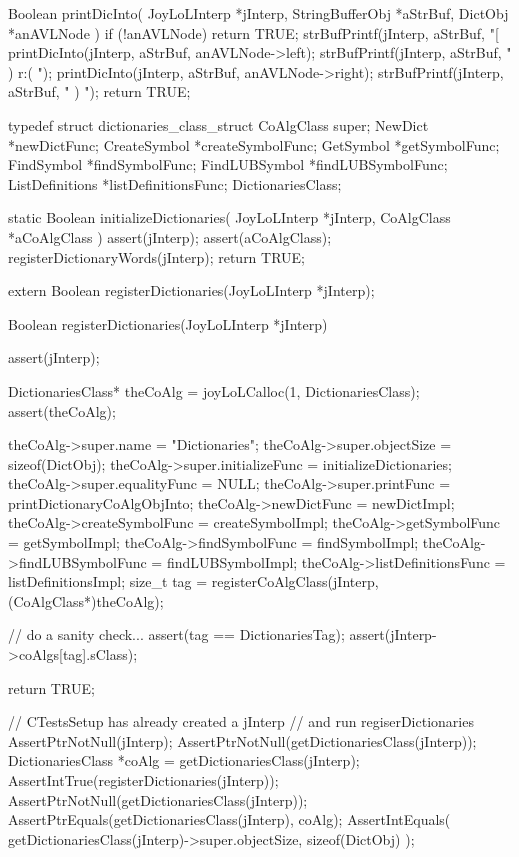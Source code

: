 Boolean printDicInto(
  JoyLoLInterp    *jInterp,
  StringBufferObj *aStrBuf,
  DictObj         *anAVLNode
) {
  if (!anAVLNode) return TRUE;
  strBufPrintf(jInterp, aStrBuf, "[%
  printDicInto(jInterp, aStrBuf, anAVLNode->left);
  strBufPrintf(jInterp, aStrBuf, " ) r:( ");
  printDicInto(jInterp, aStrBuf, anAVLNode->right);
  strBufPrintf(jInterp, aStrBuf, " ) ");
  return TRUE;
}
\stopCCode

\startTestSuite[registerDictionaries]

\startCHeader
typedef struct dictionaries_class_struct {
  CoAlgClass super;
  NewDict         *newDictFunc;
  CreateSymbol    *createSymbolFunc;
  GetSymbol       *getSymbolFunc;
  FindSymbol      *findSymbolFunc;
  FindLUBSymbol   *findLUBSymbolFunc;
  ListDefinitions *listDefinitionsFunc;
} DictionariesClass;
\stopCHeader

\startCCode
static Boolean initializeDictionaries(
  JoyLoLInterp *jInterp,
  CoAlgClass   *aCoAlgClass
) {
  assert(jInterp);
  assert(aCoAlgClass);
  registerDictionaryWords(jInterp);
  return TRUE;
}
\stopCCode

\startCHeader
extern Boolean registerDictionaries(JoyLoLInterp *jInterp);
\stopCHeader
{}

\startCCode
Boolean registerDictionaries(JoyLoLInterp *jInterp) {
  assert(jInterp);
  
  DictionariesClass* theCoAlg =
    joyLoLCalloc(1, DictionariesClass);
  assert(theCoAlg);
  
  theCoAlg->super.name            = "Dictionaries";
  theCoAlg->super.objectSize      = sizeof(DictObj);
  theCoAlg->super.initializeFunc  = initializeDictionaries;
  theCoAlg->super.equalityFunc    = NULL;
  theCoAlg->super.printFunc       = printDictionaryCoAlgObjInto;
  theCoAlg->newDictFunc           = newDictImpl;
  theCoAlg->createSymbolFunc      = createSymbolImpl;
  theCoAlg->getSymbolFunc         = getSymbolImpl;
  theCoAlg->findSymbolFunc        = findSymbolImpl;
  theCoAlg->findLUBSymbolFunc     = findLUBSymbolImpl;
  theCoAlg->listDefinitionsFunc   = listDefinitionsImpl;
  size_t tag =
    registerCoAlgClass(jInterp, (CoAlgClass*)theCoAlg);
  
  // do a sanity check...
  assert(tag == DictionariesTag);
  assert(jInterp->coAlgs[tag].sClass);
    
  return TRUE;
}
\stopCCode


\startCTest
  // CTestsSetup has already created a jInterp
  // and run regiserDictionaries
  AssertPtrNotNull(jInterp);
  AssertPtrNotNull(getDictionariesClass(jInterp));
  DictionariesClass *coAlg =
    getDictionariesClass(jInterp);
  AssertIntTrue(registerDictionaries(jInterp));
  AssertPtrNotNull(getDictionariesClass(jInterp));
  AssertPtrEquals(getDictionariesClass(jInterp), coAlg);
  AssertIntEquals(
    getDictionariesClass(jInterp)->super.objectSize, 
    sizeof(DictObj)
  );
\stopCTest
\stopTestCase
\stopTestSuite

